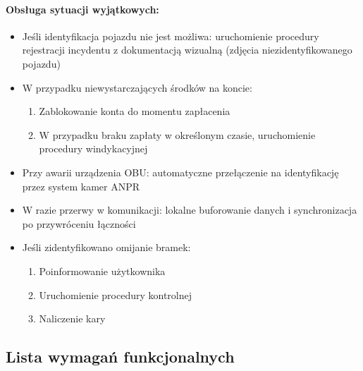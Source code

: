 \paragraph{Obsługa sytuacji wyjątkowych:}
\begin{itemize}
    \item Jeśli identyfikacja pojazdu nie jest możliwa: uruchomienie procedury rejestracji incydentu z dokumentacją wizualną (zdjęcia niezidentyfikowanego pojazdu)
    
    \item W przypadku niewystarczających środków na koncie:
    \begin{enumerate}
        \item Zablokowanie konta do momentu zapłacenia
        \item W przypadku braku zapłaty w określonym czasie, uruchomienie procedury windykacyjnej
    \end{enumerate}
    
    \item Przy awarii urządzenia OBU: automatyczne przełączenie na identyfikację przez system kamer ANPR
    
    \item W razie przerwy w komunikacji: lokalne buforowanie danych i synchronizacja po przywróceniu łączności
    
    \item Jeśli zidentyfikowano omijanie bramek:
    \begin{enumerate}
        \item Poinformowanie użytkownika
        \item Uruchomienie procedury kontrolnej
        \item Naliczenie kary
    \end{enumerate}
\end{itemize}

\subsection{Lista wymagań funkcjonalnych}

